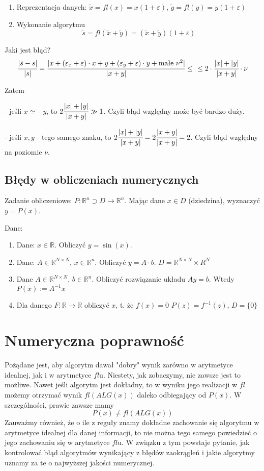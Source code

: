 \documentclass[hidelinks,a4paper,fleqn,oneside]{book}
\newcommand{\RR}{\mathbb{R}}
\newcommand{\ra}{\rightarrow}
\begin{document}
\begin{enumerate}
	\item Reprezentacja danych: $\tilde{x} = fl(x) = x(1+\varepsilon)$,
	      $\tilde{y} = fl(y) = y(1 + \varepsilon)$
	\item Wykonanie algorytmu
	      \[
	      	\tilde{s} = fl(\tilde{x} + \tilde{y}) = (\tilde{x} + \tilde{y})(1 + \varepsilon)
	      \]
\end{enumerate}

Jaki jest błąd?
\[
	\cfrac{|\tilde{s} - s|}{|s|} = \cfrac{|x + (\varepsilon_x + \varepsilon)\cdot x + y + (\varepsilon_y + \varepsilon)\cdot y + \textrm{małe }\nu^2|}{|x + y|} \leq \cfrac{}{} \leq 2 \cdot \cfrac{|x|+|y|}{|x+y|} \cdot \nu
\]

Zatem

- jeśli $x \simeq -y$, to $2\cfrac{|x|+|y|}{|x+y|} \gg 1$. Czyli błąd względny może być bardzo duży.

- jeśli $x, y$ - tego samego znaku, to $2 \cfrac{|x|+|y|}{|x+y|} = 2 \cfrac{|x+y|}{|x+y|} = 2$. Czyli błąd względny na poziomie $\nu$.

\subsection{Błędy w obliczeniach numerycznych}

Zadanie obliczeniowe: $P: \RR^n \supset D \ra \RR^n$. Mając dane $x \in D$ (dziedzina), wyznaczyć $y = P(x)$.

Dane:

\begin{enumerate}
	\item Dane: $x \in \RR$. Obliczyć $y=\sin(x)$.
	\item Dane: $A \in \RR^{N \times N}$, $x \in \RR^n$. Obliczyć $y = A \cdot b$.
	      $D = \RR^{N \times N} \times R^N$
	\item Dane $A \in \RR^{N \times N}$, $b \in \RR^n$. Obliczyć rozwiązanie układu $Ay = b$. Wtedy $P(x) := A^{-1}x$
	\item Dla danego $F: \RR \ra \RR$ obliczyć $x$, t. że $f(x) = 0$
	      $P(z) = f^{-1}(z)$, $D = \{0\}$
\end{enumerate}


\section{Numeryczna poprawność}

Pożądane jest, aby algorytm dawał "dobry" wynik zarówno w arytmetyce idealnej, jak i w arytmetyce $fl$u. Niestety, jak zobaczymy, nie zawsze jest to możliwe. Nawet jeśli algorytm jest dokładny, to w wyniku jego realizacji w $fl$ możemy otrzymać wynik $fl(ALG(x))$ daleko odbiegający od $P(x)$. W szczególności, prawie zawsze mamy
\[P(x) \neq fl(ALG(x))\]
Zauważmy również, że o ile z reguły znamy dokładne zachowanie się algorytmu w arytmetyce idealnej dla danej informacji, to nie można tego samego powiedzieć o jego zachowaniu się w arytmetyce $fl$u. W związku z tym powstaje pytanie, jak kontrolować błąd algorytmów wynikający z błędów zaokrągleń i jakie algorytmy uznamy za te o najwyższej jakości numerycznej.
\end{document}
